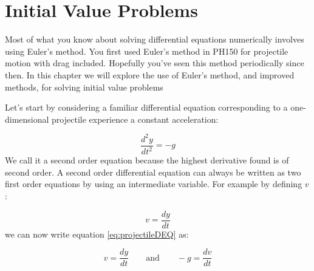 \chapter{Initial Value Problems}
\label{Lab:2}


Most of what you know about solving differential equations numerically
involves using Euler's method.  You first used Euler's method in PH150
for projectile motion with drag included.  Hopefully you've seen this
method periodically since then.  In this chapter we will explore the
use of Euler's method, and improved methods, for solving initial value problems


Let's start by considering a familiar differential equation
corresponding to a one-dimensional projectile experience a constant acceleration:

\begin{equation}\label{eq:projectileDEQ}
\frac{d^2y}{dt^2} = -g
\end{equation}
 We call it a second order equation because the
highest derivative found is of second order.  A second order
differential equation can always be written as two first order
equations by using an intermediate variable.  For example by defining $v$:

\begin{equation}
v = \frac{dy}{dt}
\end{equation}
we can now write equation
\eqref{eq:projectileDEQ} as:

\begin{equation}
v = \frac{dy}{dt}\qquad \textrm{and} \qquad -g = \frac{dv}{dt}
\end{equation} 

